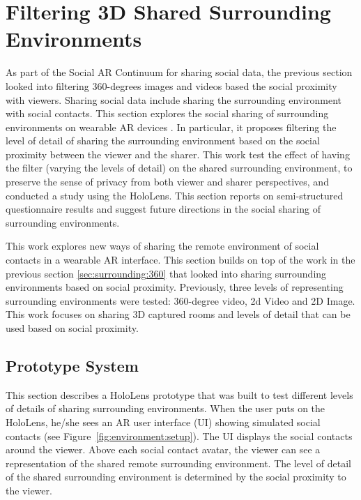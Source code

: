 \section{Filtering 3D Shared Surrounding Environments}
\label{sec:surrounding:environment}

As part of the Social AR Continuum for sharing social data, the previous section looked into filtering 360-degrees images and videos based the social proximity with viewers. Sharing social data include sharing the surrounding environment with social contacts. This section explores the social sharing of surrounding environments on wearable AR devices \cite{Nassani2018b}. In particular, it proposes filtering the level of detail of sharing the surrounding environment based on the social proximity between the viewer and the sharer. This work test the effect of having the filter (varying the levels of detail) on the shared surrounding environment, to preserve the sense of privacy from both viewer and sharer perspectives, and conducted a study using the HoloLens. This section reports on semi-structured questionnaire results and suggest future directions in the social sharing of surrounding environments.

This work explores new ways of sharing the remote environment of social contacts in a wearable AR interface. This section builds on top of the work in the previous section \ref{sec:surrounding:360}  that looked into sharing surrounding environments based on social proximity. Previously, three levels of representing surrounding environments were tested: 360-degree video, 2d Video and 2D Image. This work focuses on sharing 3D captured rooms and levels of detail that can be used based on social proximity. 

\subsection{Prototype System}

This section describes a HoloLens prototype that was built to test different levels of details of sharing surrounding environments. When the user puts on the HoloLens, he/she sees an AR user interface (UI) showing simulated social contacts (see Figure~\ref{fig:environment:setup}). The UI displays the social contacts around the viewer. Above each social contact avatar, the viewer can see a representation of the shared remote surrounding environment. The level of detail of the shared surrounding environment is determined by the social proximity to the viewer.

